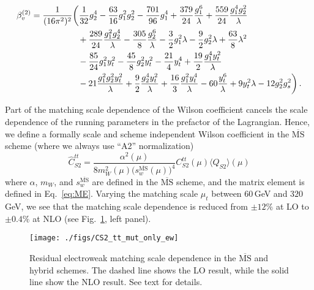 \documentclass[letter,11pt,DIV=12,abstract=true,numbers=noenddot,titlepage=false,twocolumn=false,draft=false]{scrartcl}
\newcommand{\MS}{$\overline{\text{MS}}$}
\begin{document}
\begin{equation}
\begin{split}
  \beta_{v}^{(2)}
& = \frac{1}{(16\pi^2)^2}
    \bigg(   \frac{1}{32} g_2^4
           - \frac{63}{16} g_1^2 g_2^2
           - \frac{701}{96} g_1^4
           + \frac{379}{24} \frac{g_1^6}{\lambda}
           + \frac{559}{24} \frac{g_1^4 g_2^2}{\lambda}\\
& \hspace{5.5em}
           + \frac{289}{24} \frac{g_1^2 g_2^4}{\lambda}
           - \frac{305}{8} \frac{g_2^6}{\lambda}
           - \frac{3}{2} g_1^2 \lambda
           - \frac{9}{2} g_2^2 \lambda
           + \frac{63}{8} \lambda^2 \\
& \hspace{5.5em}
           - \frac{85}{24} g_1^2 y_t^2
           - \frac{45}{8} g_2^2 y_t^2
           - \frac{21}{4} y_t^4
           + \frac{19}{2} \frac{g_1^4 y_t^2}{\lambda} \\
& \hspace{5.5em}
           - 21 \frac{g_1^2 g_2^2 y_t^2}{\lambda}
           + \frac{9}{2} \frac{g_2^4 y_t^2}{\lambda}
           + \frac{16}{3} \frac{g_1^2 y_t^4}{\lambda}
           - 60 \frac{y_t^6}{\lambda}
           + 9 y_t^2 \lambda
           - 12 g_2^2 g_s^2
    \bigg) \,.
\end{split}
\end{equation}

Part of the matching scale dependence of the Wilson coefficient cancels
the scale dependence of the running parameters in the prefactor of the
Lagrangian. Hence, we define a formally scale and scheme independent
Wilson coefficient in the \MS{} scheme (where we always use ``A2''
normalization)
\begin{equation}
  \hat C_{S2}^{tt} =
  \frac{\alpha^2(\mu)}{8 m_W^2(\mu) \big(s_w^{\overline{\text{MS}}}(\mu)\big)^4}
  C_{S2}^{tt}(\mu) \langle Q_{S2}\rangle (\mu)
\end{equation}
where $\alpha$, $m_W$, and $s_w^{\overline{\text{MS}}}$ are defined in
the \MS{} scheme, and the matrix element is defined in
Eq.~\eqref{eq:ME}. Varying the matching scale $\mu_t$ between
$60\,$GeV and $320\,$GeV, we see that the matching scale dependence is
reduced from $\pm 12\%$ at LO to $\pm 0.4\%$ at NLO (see
Fig.~\ref{fig:all:schemes}, left panel).

\begin{figure}[t]
        \centering
        \texttt{[image: ./figs/CS2\_tt\_mut\_only\_ew]}
        \caption{Residual electroweak matching scale dependence in the
          \MS{} and hybrid schemes. The dashed line shows the LO
          result, while the solid line show the NLO result. See text
          for details.
	\label{fig:all:schemes}}
\end{figure}
\end{document}
